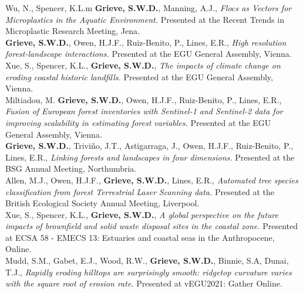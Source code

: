 \documentclass[10pt, a4paper]{article}
\newcommand{\student}{\textbf{\textsuperscript{\textdagger}}}
\newcommand{\years}[1]{\marginnote{\scriptsize #1}}
\begin{document}
\years{2023}Wu, N.\student, Spencer, K.L.m \textbf{Grieve, S.W.D.}, Manning, A.J., \textit{Flocs as Vectors for Microplastics in the Aquatic Environment.} Presented at the Recent Trends in Microplastic Research Meeting, Jena.\\[0.05cm]

\years{2023}\textbf{Grieve, S.W.D.}, Owen, H.J.F., Ruiz-Benito, P., Lines, E.R., \textit{High resolution forest-landscape interactions.} Presented at the EGU General Assembly, Vienna.\\[0.05cm]

\years{2023}Xue, S.\student, Spencer, K.L., \textbf{Grieve, S.W.D.}, \textit{The impacts of climate change on eroding coastal historic landfills.} Presented at the EGU General Assembly, Vienna.\\[0.05cm]

\years{2023} Miltiadou, M. \textbf{Grieve, S.W.D.}, Owen, H.J.F., Ruiz-Benito, P., Lines, E.R., \textit{Fusion of European forest inventories with Sentinel-1 and Sentinel-2 data for improving scalability in estimating forest variables.} Presented at the EGU General Assembly, Vienna.\\[0.05cm]

\years{2022}\textbf{Grieve, S.W.D.}, Trivi\~{n}o, J.T., Astigarraga, J., Owen, H.J.F., Ruiz-Benito, P., Lines, E.R., \textit{Linking forests and landscapes in four dimensions.} Presented at the BSG Annual Meeting, Northumbria.\\[0.05cm]

\years{2021}Allen, M.J.\student, Owen, H.J.F., \textbf{Grieve, S.W.D.}, Lines, E.R., \textit{Automated tree species classification from forest Terrestrial Laser Scanning data.} Presented at the British Ecological Society Annual Meeting, Liverpool.\\[0.05cm]

\years{2021}Xue, S.\student, Spencer, K.L., \textbf{Grieve, S.W.D.}, \textit{A global perspective on the future impacts of brownfield and solid waste disposal sites in the coastal zone.} Presented at ECSA 58 - EMECS 13: Estuaries and coastal seas in the Anthropocene, Online.\\[0.05cm]

\years{2021}Mudd, S.M., Gabet, E.J., Wood, R.W., \textbf{Grieve, S.W.D.}, Binnie, S.A, Dunai, T.J., \textit{Rapidly eroding hilltops are surprisingly smooth: ridgetop curvature varies with the square root of erosion rate.} Presented at vEGU2021: Gather Online.\\[0.05cm]
\end{document}

